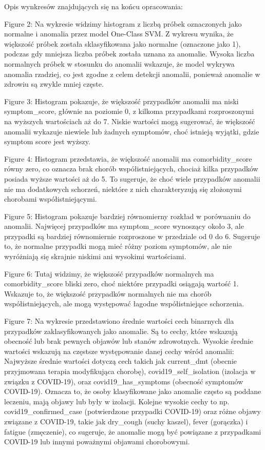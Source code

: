 \documentclass[a4paper,fleqn]{cas-dc}
\begin{document}
Opis wynkresów znajdujących się na końcu opracowania:

Figure 2: Na wykresie widzimy histogram z liczbą próbek oznaczonych jako normalne i anomalia przez model One-Class SVM.
Z wykresu wynika, że większość próbek została sklasyfikowana jako normalne (oznaczone jako 1), podczas gdy mniejsza liczba próbek została uznana za anomalie.
Wysoka liczba normalnych próbek w stosunku do anomalii wskazuje, że model wykrywa anomalia rzadziej, co jest zgodne z celem detekcji anomalii, ponieważ anomalie w zdrowiu są zwykle mniej częste.


Figure 3: Histogram pokazuje, że większość przypadków anomalii ma niski symptom\_score, głównie na poziomie 0, z kilkoma przypadkami rozproszonymi na wyższych wartościach aż do 7. Niskie wartości mogą sugerować, że większość anomalii wykazuje niewiele lub żadnych symptomów, choć istnieją wyjątki, gdzie symptom score jest wyższy.


Figure 4: Histogram przedstawia, że większość anomalii ma comorbidity\_score równy zero, co oznacza brak chorób współistniejących, chociaż kilka przypadków posiada wyższe wartości aż do 5. To sugeruje, że choć wiele przypadków anomalii nie ma dodatkowych schorzeń, niektóre z nich charakteryzują się złożonymi chorobami współistniejącymi.


Figure 5: Histogram pokazuje bardziej równomierny rozkład w porównaniu do anomalii. Najwięcej przypadków ma symptom\_score wynoszący około 3, ale przypadki są bardziej równomiernie rozproszone w przedziale od 0 do 6. Sugeruje to, że normalne przypadki mogą mieć różny poziom symptomów, ale nie wyróżniają się skrajnie niskimi ani wysokimi wartościami.


Figure 6: Tutaj widzimy, że większość przypadków normalnych ma comorbidity\_score bliski zero, choć niektóre przypadki osiągają wartość 1. Wskazuje to, że większość przypadków normalnych nie ma chorób współistniejących, ale mogą występować łagodne współistniejące schorzenia.

Figure 7: Na wykresie przedstawiono średnie wartości cech binarnych dla przypadków zaklasyfikowanych jako anomalie. Są to cechy, które wskazują obecność lub brak pewnych objawów lub stanów zdrowotnych. Wysokie średnie wartości wskazują na częstsze występowanie danej cechy wśród anomalii:
Najwyższe średnie wartości dotyczą cech takich jak current\_dmt (obecnie przyjmowana terapia modyfikująca chorobę), covid19\_self\_isolation (izolacja w związku z COVID-19), oraz covid19\_has\_symptoms (obecność symptomów COVID-19). Oznacza to, że osoby klasyfikowane jako anomalie często są poddane leczeniu, mają objawy lub były w izolacji.
Kolejne wysokie cechy to np. covid19\_confirmed\_case (potwierdzone przypadki COVID-19) oraz różne objawy związane z COVID-19, takie jak dry\_cough (suchy kaszel), fever (gorączka) i fatigue (zmęczenie), co sugeruje, że anomalie mogą być powiązane z przypadkami COVID-19 lub innymi poważnymi objawami chorobowymi.
\end{document}
